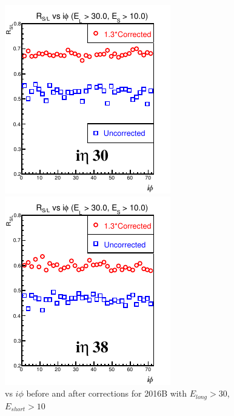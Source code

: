\begin{figure}[!h] %
\begin{minipage}[c]{0.5\linewidth}
\centering
\includegraphics[width=0.7\linewidth]{../Figures/Chap2/ImageFiles_HF/Ratio/2016/Corrected/EnegyCut3010/ieta30Ecut1CorrectionEcut3.pdf}
\end{minipage}
\begin{minipage}[c]{0.5\linewidth}
\centering
\includegraphics[width=0.7\linewidth]{../Figures/Chap2/ImageFiles_HF/Ratio/2016/Corrected/EnegyCut3010/ieta38Ecut1CorrectionEcut3.pdf}
\end{minipage}
\caption[\ratiosl vs $i\phi$ with $E_{long} > 30$, $E_{short} >10$]{\ratiosl vs $i\phi$ before and after corrections for 2016B with $E_{long} > 30$, $E_{short} >10$}
\label{Ecut1CorrectionEcut3}
\end{figure}
